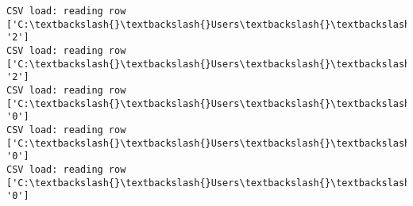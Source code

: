 \documentclass[11pt]{article}
\begin{document}
\begin{Verbatim}[commandchars=\\\{\}]
CSV load: reading row ['C:\textbackslash{}\textbackslash{}Users\textbackslash{}\textbackslash{}AbhishekGangadhar\textbackslash{}\textbackslash{}Downloads\textbackslash{}\textbackslash{}ActionRecog\textbackslash{}\textbackslash{}ActionRecog\textbackslash{}\textbackslash{}DataSets\textbackslash{}\textbackslash{}UCF11\textbackslash{}\textbackslash{}action\_youtube\_naudio\textbackslash{}\textbackslash{}trampoline\_jumping\textbackslash{}\textbackslash{}v\_jumping\_06\textbackslash{}\textbackslash{}v\_jumping\_06\_03.avi', '2']
CSV load: reading row ['C:\textbackslash{}\textbackslash{}Users\textbackslash{}\textbackslash{}AbhishekGangadhar\textbackslash{}\textbackslash{}Downloads\textbackslash{}\textbackslash{}ActionRecog\textbackslash{}\textbackslash{}ActionRecog\textbackslash{}\textbackslash{}DataSets\textbackslash{}\textbackslash{}UCF11\textbackslash{}\textbackslash{}action\_youtube\_naudio\textbackslash{}\textbackslash{}trampoline\_jumping\textbackslash{}\textbackslash{}v\_jumping\_06\textbackslash{}\textbackslash{}v\_jumping\_06\_04.avi', '2']
CSV load: reading row ['C:\textbackslash{}\textbackslash{}Users\textbackslash{}\textbackslash{}AbhishekGangadhar\textbackslash{}\textbackslash{}Downloads\textbackslash{}\textbackslash{}ActionRecog\textbackslash{}\textbackslash{}ActionRecog\textbackslash{}\textbackslash{}DataSets\textbackslash{}\textbackslash{}UCF11\textbackslash{}\textbackslash{}action\_youtube\_naudio\textbackslash{}\textbackslash{}biking\textbackslash{}\textbackslash{}v\_biking\_02\textbackslash{}\textbackslash{}v\_biking\_02\_01.avi', '0']
CSV load: reading row ['C:\textbackslash{}\textbackslash{}Users\textbackslash{}\textbackslash{}AbhishekGangadhar\textbackslash{}\textbackslash{}Downloads\textbackslash{}\textbackslash{}ActionRecog\textbackslash{}\textbackslash{}ActionRecog\textbackslash{}\textbackslash{}DataSets\textbackslash{}\textbackslash{}UCF11\textbackslash{}\textbackslash{}action\_youtube\_naudio\textbackslash{}\textbackslash{}biking\textbackslash{}\textbackslash{}v\_biking\_02\textbackslash{}\textbackslash{}v\_biking\_02\_02.avi', '0']
CSV load: reading row ['C:\textbackslash{}\textbackslash{}Users\textbackslash{}\textbackslash{}AbhishekGangadhar\textbackslash{}\textbackslash{}Downloads\textbackslash{}\textbackslash{}ActionRecog\textbackslash{}\textbackslash{}ActionRecog\textbackslash{}\textbackslash{}DataSets\textbackslash{}\textbackslash{}UCF11\textbackslash{}\textbackslash{}action\_youtube\_naudio\textbackslash{}\textbackslash{}biking\textbackslash{}\textbackslash{}v\_biking\_02\textbackslash{}\textbackslash{}v\_biking\_02\_03.avi', '0']

\end{Verbatim}
\end{document}
